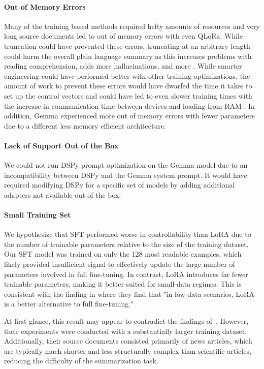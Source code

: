 \paragraph{Out of Memory Errors}
Many of the training based methods required hefty amounts of resources and very long source documents led to out of memory errors with even QLoRa. While truncation could have prevented these errors, truncating at an arbitrary length could harm the overall plain language summary as this increases problems with reading comprehension, adds more hallucinations, and more \cite{ding2024fewertruncationsimprovelanguage}. While smarter engineering could have performed better with other training optimizations, the amount of work to prevent these errors would have dwarfed the time it takes to set up the control vectors and could have led to even slower training times with the increase in communication time between devices and loading from RAM \cite{rajbhandari2020zeromemoryoptimizationstraining}. In addition, Gemma experienced more out of memory errors with fewer parameters  due to a different less memory efficient architecture. 
\paragraph{Lack of Support Out of the Box}
We could not run DSPy prompt optimization on the Gemma model due to an incompatibility between DSPy and the Gemma system prompt. It would have required modifying DSPy for a specific set of models by adding additional adapters not available out of the box. 
\paragraph{Small Training Set}
We hypothesize that SFT performed worse in controllability than LoRA due to the number of trainable parameters relative to the size of the training dataset. Our SFT model was trained on only the 128 most readable examples, which likely provided insufficient signal to effectively update the large number of parameters involved in full fine-tuning. In contrast, LoRA introduces far fewer trainable parameters, making it better suited for small-data regimes. This is consistent with the finding in \cite{whitehouse-etal-2024-low} where they find that "in low-data scenarios, LoRA is a better alternative to full fine-tuning."

At first glance, this result may appear to contradict the findings of~\textcite{ribeiro-etal-2023-generating}. However, their experiments were conducted with a substantially larger training dataset. Additionally, their source documents consisted primarily of news articles, which are typically much shorter and less structurally complex than scientific articles, reducing the difficulty of the summarization task.
